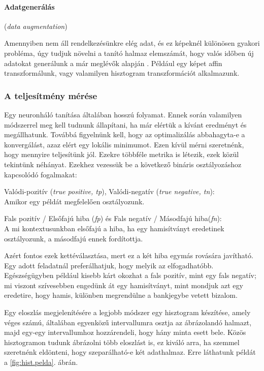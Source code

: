 \paragraph{Adatgenerálás} (\textit{data augmentation})

Amennyiben nem áll rendelkezésünkre elég adat, és ez képeknél 
különösen gyakori probléma, úgy tudjuk növelni a tanító halmaz
elemszámát, hogy valós időben új adatokat generálunk a már
meglévők alapján \cite{krizhevsky2012imagenet}. Például egy képet affin transzformálunk,
vagy valamilyen hisztogram transzformációt alkalmazunk.


\subsubsection{A teljesítmény mérése}

Egy neuronháló tanítása általában hosszú folyamat. Ennek során valamilyen módszerrel meg kell
tudnunk állapítani, ha már elértük a kívánt eredményt és megállhatunk. Továbbá figyelnünk kell, 
hogy az optimalizálás abbahagyta-e a konvergálást, azaz elért egy 
lokális minimumot.
Ezen kívül mérni szeretnénk, hogy mennyire teljesítünk jól. 
Ezekre többféle metrika is létezik, ezek közül tekintünk néhányat.
Ezekhez vezessük be a következő bináris osztályozáshoz kapcsolódó fogalmakat:


Valódi-pozitív (\textit{true positive, tp}), 
Valódi-negatív (\textit{true negative, tn}): \\
Amikor egy példát megfelelően osztályozunk.

Fals pozitív / Elsőfajú hiba (\textit{fp}) 
és Fals negatív / Másodfajú hiba(\textit{fn}): \\
A mi kontextusunkban elsőfajú a hiba, ha egy hamisítványt eredetinek
osztályozunk, a másodfajú ennek fordítottja.

Azért fontos ezek kettéválasztása, mert ez a két hiba egymás rovására 
javítható. Egy adott feladatnál preferálhatjuk, hogy melyik az elfogadhatóbb.
Egészségügyben például kisebb kárt okozhat a fals pozitív, mint egy fals negatív;
mi viszont szívesebben engedünk át egy hamisítványt, mint mondjuk  azt egy eredetire, hogy hamis,
különben megrendülne a bankjegybe vetett bizalom.



Egy eloszlás megjelenítésére a legjobb módszer egy hisztogram készítése, amely véges számú, általában egyenközű intervallumra osztja az ábrázolandó halmazt, majd egy-egy intervallumhoz hozzárendeli, hogy hány minta esett bele. Közös hisztogramon tudunk ábrázolni több eloszlást is, ez kiváló arra, ha szemmel szeretnénk eldönteni, hogy szeparálható-e két adathalmaz. Erre láthatunk példát a \ref{fig:hist.pelda}. ábrán.

